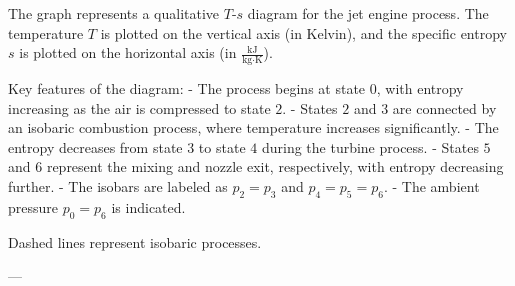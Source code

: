 The graph represents a qualitative \( T \)-\( s \) diagram for the jet engine process. The temperature \( T \) is plotted on the vertical axis (in Kelvin), and the specific entropy \( s \) is plotted on the horizontal axis (in \( \frac{\text{kJ}}{\text{kg·K}} \)).  

Key features of the diagram:  
- The process begins at state \( 0 \), with entropy increasing as the air is compressed to state \( 2 \).  
- States \( 2 \) and \( 3 \) are connected by an isobaric combustion process, where temperature increases significantly.  
- The entropy decreases from state \( 3 \) to state \( 4 \) during the turbine process.  
- States \( 5 \) and \( 6 \) represent the mixing and nozzle exit, respectively, with entropy decreasing further.  
- The isobars are labeled as \( p_2 = p_3 \) and \( p_4 = p_5 = p_6 \).  
- The ambient pressure \( p_0 = p_6 \) is indicated.  

Dashed lines represent isobaric processes.  

---